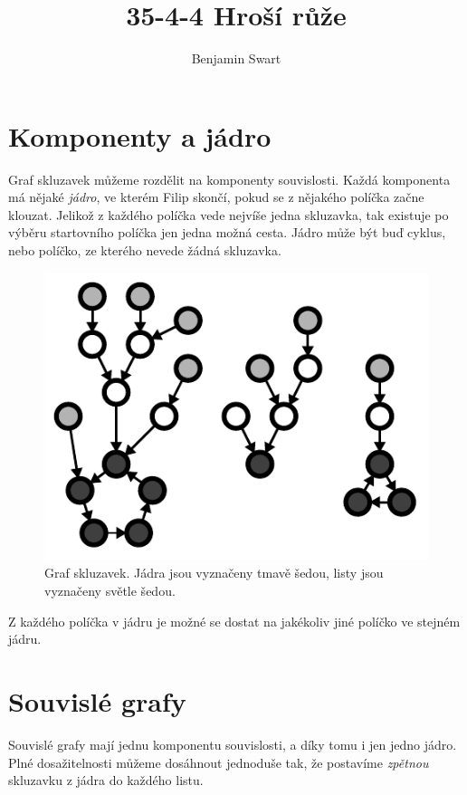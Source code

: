 \documentclass{article}
\title{35-4-4 Hroší růže}
\author{Benjamin Swart}
\begin{document}
\maketitle

\section{Komponenty a jádro}

Graf skluzavek můžeme rozdělit na komponenty souvislosti. Každá komponenta má nějaké \textit{jádro}, ve kterém Filip skončí, pokud se z nějakého políčka začne klouzat. Jelikož z každého políčka vede nejvíše jedna skluzavka, tak existuje po výběru startovního políčka jen jedna možná cesta. Jádro může být buď cyklus, nebo políčko, ze kterého nevede žádná skluzavka.

\begin{figure}[ht]
    \centering
    \includegraphics{cores.pdf}
    \caption[Graf skluzavek]{Graf skluzavek. Jádra jsou vyznačeny tmavě šedou, listy jsou vyznačeny světle šedou.}
\end{figure}

Z každého políčka v jádru je možné se dostat na jakékoliv jiné políčko ve stejném jádru.

\section{Souvislé grafy}

Souvislé grafy mají jednu komponentu souvislosti, a díky tomu i jen jedno jádro. Plné dosažitelnosti můžeme dosáhnout jednoduše tak, že postavíme \textit{zpětnou} skluzavku z jádra do každého listu.
\end{document}

